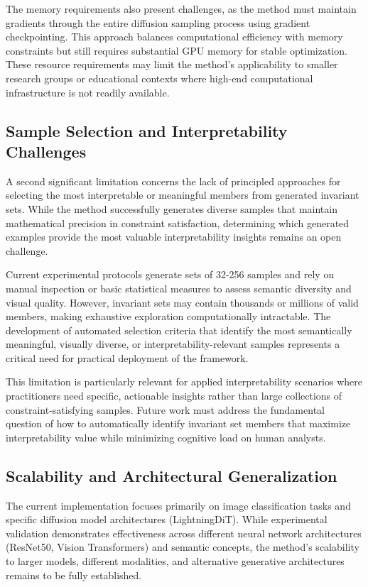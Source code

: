 The memory requirements also present challenges, as the method must maintain gradients through the entire diffusion sampling process using gradient checkpointing. This approach balances computational efficiency with memory constraints but still requires substantial GPU memory for stable optimization. These resource requirements may limit the method's applicability to smaller research groups or educational contexts where high-end computational infrastructure is not readily available.

\subsection{Sample Selection and Interpretability Challenges}

A second significant limitation concerns the lack of principled approaches for selecting the most interpretable or meaningful members from generated invariant sets. While the method successfully generates diverse samples that maintain mathematical precision in constraint satisfaction, determining which generated examples provide the most valuable interpretability insights remains an open challenge.

Current experimental protocols generate sets of 32-256 samples and rely on manual inspection or basic statistical measures to assess semantic diversity and visual quality. However, invariant sets may contain thousands or millions of valid members, making exhaustive exploration computationally intractable. The development of automated selection criteria that identify the most semantically meaningful, visually diverse, or interpretability-relevant samples represents a critical need for practical deployment of the framework.

This limitation is particularly relevant for applied interpretability scenarios where practitioners need specific, actionable insights rather than large collections of constraint-satisfying samples. Future work must address the fundamental question of how to automatically identify invariant set members that maximize interpretability value while minimizing cognitive load on human analysts.

\subsection{Scalability and Architectural Generalization}

The current implementation focuses primarily on image classification tasks and specific diffusion model architectures (LightningDiT). While experimental validation demonstrates effectiveness across different neural network architectures (ResNet50, Vision Transformers) and semantic concepts, the method's scalability to larger models, different modalities, and alternative generative architectures remains to be fully established.

